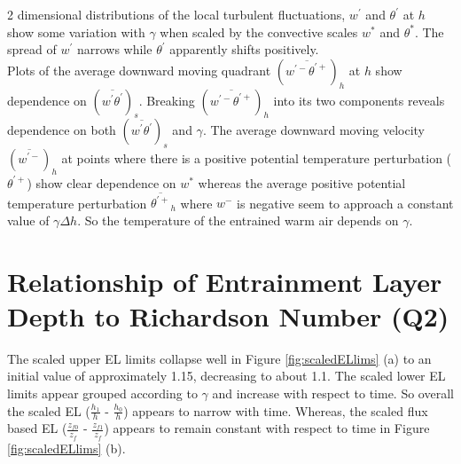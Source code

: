 2 dimensional distributions of the local turbulent fluctuations, $w^{'}$ and $\theta^{'}$ at $h$ show some variation with $\gamma$ when scaled by the convective scales $w^{*}$ and $\theta^{*}$.  The spread of $w^{'}$ narrows while $\theta^{'}$ apparently shifts positively.\\

Plots of the average downward moving quadrant $(\overline{w^{'-}\theta^{'+}})_{h}$ at $h$ show dependence on $(\overline{w^{'}\theta^{'}})_{s}$. Breaking $(\overline{w^{'-}\theta^{'+}})_{h}$ into its two components reveals dependence on both $(\overline{w^{'}\theta^{'}})_{s}$ and $\gamma$. The average downward moving velocity $(\overline{w^{'-}})_{h}$ at points where there is a positive potential temperature perturbation ($\theta^{'+}$) show clear dependence on $w^{*}$ whereas the average positive potential temperature perturbation $\overline{\theta^{'+}}_{h}$ where $w^{-}$ is negative seem to approach a constant value of $\gamma \Delta h$. So the temperature of the entrained warm air depends on $\gamma$.

\clearpage



\section{Relationship of Entrainment Layer Depth to Richardson Number (Q2)}
\label{sec:deltahri}
\FloatBarrier

The scaled upper \acs{EL} limits collapse well in Figure \ref{fig:scaledELlims} (a) 
to an initial value of approximately 1.15, decreasing to about 1.1.  The scaled lower \acs{EL} limits appear 
grouped according to $\gamma$ and increase with respect to time.  So overall the scaled \acs{EL} ($\frac{h_{1}}{h}$ - $\frac{h_{0}}{h}$) appears
to narrow with time.  Whereas, the scaled flux based \acs{EL} ($\frac{z_{f0}}{z_{f}}$ - $\frac{z_{f1}}{z_{f}}$) appears to remain constant 
with respect to time in Figure \ref{fig:scaledELlims} (b).\\

